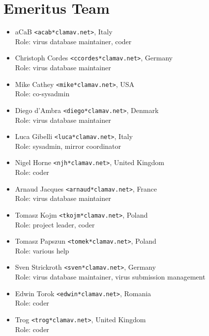 \documentclass[a4paper,titlepage,12pt]{article}
\newcommand{\email}[1]{\texttt{#1}}
\begin{document}
    \section{Emeritus Team}

    \begin{itemize}
	\item aCaB \email{<acab*clamav.net>}, Italy\\
	Role: virus database maintainer, coder

	\item Christoph Cordes \email{<ccordes*clamav.net>}, Germany\\
	Role: virus database maintainer

	\item Mike Cathey \email{<mike*clamav.net>}, USA\\
	Role: co-sysadmin

	\item Diego d'Ambra \email{<diego*clamav.net>}, Denmark\\
	Role: virus database maintainer

	\item Luca Gibelli \email{<luca*clamav.net>}, Italy\\
	Role: sysadmin, mirror coordinator

	\item Nigel Horne \email{<njh*clamav.net>}, United Kingdom\\
	Role: coder

	\item Arnaud Jacques \email{<arnaud*clamav.net>}, France\\
	Role: virus database maintainer

	\item Tomasz Kojm \email{<tkojm*clamav.net>}, Poland\\
	Role: project leader, coder

	\item Tomasz Papszun \email{<tomek*clamav.net>}, Poland\\
	Role: various help

	\item Sven Strickroth \email{<sven*clamav.net>}, Germany\\
	Role: virus database maintainer, virus submission management

	\item Edwin Torok \email{<edwin*clamav.net>}, Romania\\
	Role: coder

	\item Trog \email{<trog*clamav.net>}, United Kingdom\\
	Role: coder
    \end{itemize}
\end{document}
